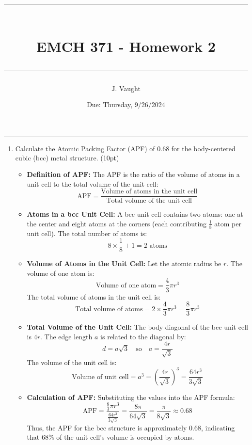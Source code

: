 \documentclass[10pt]{article}
\title{\vspace{-2cm}\hrule\vspace{0.5cm}\\EMCH 371 - Homework 2\vspace{0.5cm}\hrule}
\author{\vspace{-1cm}J. Vaught}
\date{\vspace{-0.2cm}Due: Thursday, 9/26/2024}
\begin{document}
\maketitle

\vspace{-0.4cm}
\hrule
\vspace{0.5cm}

\begin{enumerate}[leftmargin=0.7cm, label=\textbf{\arabic*.}, itemsep=1em]

	\item Calculate the Atomic Packing Factor (APF) of 0.68 for the body-centered cubic (bcc) metal structure. (10pt)
	    \begin{itemize}[leftmargin=0.5cm]
        \item \textbf{Definition of APF:} The APF is the ratio of the volume of atoms in a unit cell to the total volume of the unit cell:
        \[
        \text{APF} = \frac{\text{Volume of atoms in the unit cell}}{\text{Total volume of the unit cell}}
        \]

        \item \textbf{Atoms in a bcc Unit Cell:} A bcc unit cell contains two atoms: one at the center and eight atoms at the corners (each contributing \( \frac{1}{8} \) atom per unit cell). The total number of atoms is:
        \[
        8 \times \frac{1}{8} + 1 = 2 \text{ atoms}
        \]

        \item \textbf{Volume of Atoms in the Unit Cell:} Let the atomic radius be \( r \). The volume of one atom is:
        \[
        \text{Volume of one atom} = \frac{4}{3} \pi r^3
        \]
        The total volume of atoms in the unit cell is:
        \[
        \text{Total volume of atoms} = 2 \times \frac{4}{3} \pi r^3 = \frac{8}{3} \pi r^3
        \]

        \item \textbf{Total Volume of the Unit Cell:} The body diagonal of the bcc unit cell is \( 4r \). The edge length \( a \) is related to the diagonal by:
        \[
        d = a\sqrt{3} \quad \text{so} \quad a = \frac{4r}{\sqrt{3}}
        \]
        The volume of the unit cell is:
        \[
        \text{Volume of unit cell} = a^3 = \left( \frac{4r}{\sqrt{3}} \right)^3 = \frac{64r^3}{3\sqrt{3}}
        \]

        \item \textbf{Calculation of APF:} Substituting the values into the APF formula:
        \[
        \text{APF} = \frac{\frac{8}{3} \pi r^3}{\frac{64r^3}{3\sqrt{3}}} = \frac{8 \pi}{64 \sqrt{3}} = \frac{\pi}{8 \sqrt{3}} \approx 0.68
        \]
        Thus, the APF for the bcc structure is approximately 0.68, indicating that 68\% of the unit cell's volume is occupied by atoms.
    \end{itemize}
    \begin{center}
\end{center}
\end{enumerate}
\end{document}

